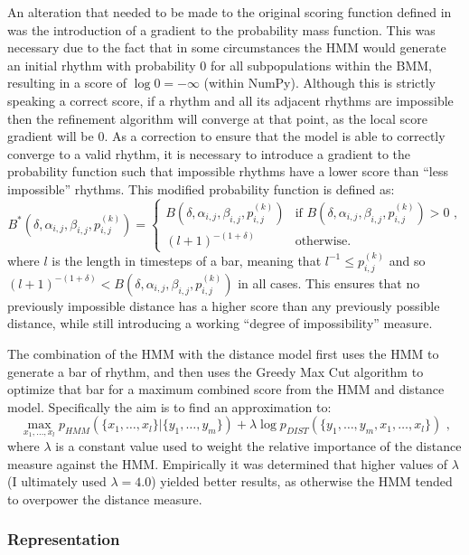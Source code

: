 \documentclass[ author={Stephen Livermore-Tozer},
				supervisor={Dr. Peter Flach},
				degree={MEng},
				title={Algorithmic Co-composition Using Machine Learning},
				subtitle={},
				type={research},
				year={2016} ]{dissertation}
\begin{document}
	An alteration that needed to be made to the original scoring function defined in \cite{paiement2007generative} was the introduction of a gradient to the probability mass function. This was necessary due to the fact that in some circumstances the HMM would generate an initial rhythm with probability $0$ for all subpopulations within the BMM, resulting in a score of $\log 0 = -\infty$ (within NumPy). Although this is strictly speaking a correct score, if a rhythm and all its adjacent rhythms are impossible then the refinement algorithm will converge at that point, as the local score gradient will be $0$. As a correction to ensure that the model is able to correctly converge to a valid rhythm, it is necessary to introduce a gradient to the probability function such that impossible rhythms have a lower score than ``less impossible'' rhythms. This modified probability function is defined as:
	$$B^*(\delta,\alpha_{i,j},\beta_{i,j},p_{i,j}^{(k)}) =
	\begin{cases}
		B(\delta,\alpha_{i,j},\beta_{i,j},p_{i,j}^{(k)}) & \text{if } B(\delta,\alpha_{i,j},\beta_{i,j},p_{i,j}^{(k)}) > 0 \text{ ,} \\
		(l+1)^{-(1 + \delta)} & \text{otherwise.}
	\end{cases}$$
	where $l$ is the length in timesteps of a bar, meaning that $l^{-1} \leq p_{i,j}^{(k)}$ and so $(l+1)^{-(1 + \delta)} < B(\delta,\alpha_{i,j},\beta_{i,j},p_{i,j}^{(k)})$ in all cases. This ensures that no previously impossible distance has a higher score than any previously possible distance, while still introducing a working ``degree of impossibility'' measure. 
	
	The combination of the HMM with the distance model first uses the HMM to generate a bar of rhythm, and then uses the Greedy Max Cut algorithm \cite{rohde2002methods} to optimize that bar for a maximum combined score from the HMM and distance model. Specifically the aim is to find an approximation to:
	$$ \max_{x_1,\dots,x_l} p_{HMM}(\{x_1,\dots,x_l\} | \{y_1,\dots,y_m\}) + \lambda \log p_{DIST}(\{y_1,\dots,y_m,x_1,\dots,x_l\}) \text{ ,} $$
	where $\lambda$ is a constant value used to weight the relative importance of the distance measure against the HMM. Empirically it was determined that higher values of $\lambda$ (I ultimately used $\lambda = 4.0$) yielded better results, as otherwise the HMM tended to overpower the distance measure.
	
	\subsubsection{Representation}
	
\end{document}

